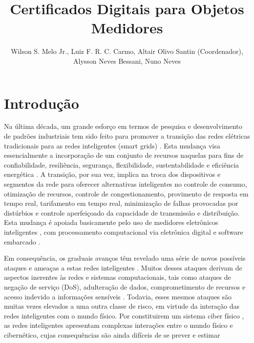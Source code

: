 \documentclass[12pt]{article}
\title{Certificados Digitais para Objetos Medidores}
\author{
  Wilson S. Melo Jr.\inst{1,2}, Luiz F. R. C. Carmo\inst{1,2}, Altair Olivo Santin\inst{3} (Coordenador),\\
  Alysson Neves Bessani\inst{4}, Nuno Neves\inst{4}}
\begin{document}
 

\maketitle

     

\section{Introdução}
Na última década, um grande esforço em termos de pesquisa e desenvolvimento de padrões industriais tem sido feito para promover a transição das redes elétricas tradicionais para as redes inteligentes (smart grids) \cite{fang2012smart}. Esta mudança visa essencialmente a incorporação de um conjunto de recursos naquelas para fins de confiabilidade, resiliência, segurança, flexibilidade, sustentabilidade e eficiência energética \cite{Rust2010}. A transição, por sua vez, implica na troca dos dispositivos e segmentos da rede para oferecer alternativas inteligentes no controle de consumo, otimização de recursos, controle de congestionamento, provimento de resposta em tempo real, tarifamento em tempo real, minimização de falhas provocadas por distúrbios e controle aperfeiçoado da capacidade de transmissão e distribuição. Esta mudança é apoiada basicamente pelo uso de medidores eletrônicos inteligentes \cite{Zheng2013}, com processamento computacional via eletrônica digital e software embarcado \cite{Rust2010}.

Em consequência, os graduais avanços têm revelado uma série de novos possíveis ataques e ameaças a estas redes inteligentes \cite{Mo2012a,Li2012,Wang2013,Komninos2014}. Muitos desses ataques derivam de aspectos inerentes às redes e sistemas computacionais, tais como  ataques de negação de serviço (DoS), adulteração de dados, comprometimento de recursos e acesso indevido a informações sensíveis \cite{Wang2013}. Todavia, esses mesmos ataques são muitas vezes elevados a uma outra classe de risco, em virtude da interação das redes inteligentes com o mundo físico. Por constituirem um sistema ciber físico \cite{Rawung2014}, as redes inteligentes apresentam complexas interações entre o mundo físico e cibernético, cujas consequências são ainda difíceis de se prever e estimar \cite{Mitra2013}
\end{document}
